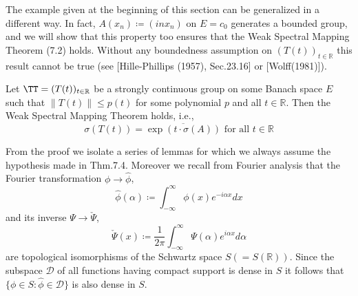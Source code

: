 The example given at the beginning of this section can be generalized in a different way.
In fact, $A(x_{n}) \coloneqq (inx_{n})$ on $E = c_{0}$ generates a bounded group, and we will show that this property too ensures that the Weak Spectral Mapping Theorem (7.2) holds.
Without any boundedness assumption on $(T(t))_{t\in\mathbb{R}}$ this result cannot be true (see [Hille-Phillips (1957), Sec.23.16] or [Wolff(1981)]).


\newpage
\begin{theorem}\label{thm:a3-7.4}
	Let $\TT = (T(t))_{t\in\mathbb{R}}$ be a strongly continuous group on some Banach space $E$ such that $\|T(t)\| \leq p(t)$ for some polynomial $p$ and all $t \in \mathbb{R}$.
	Then the Weak Spectral Mapping Theorem holds, i.e.,
	\[
	\sigma(T(t)) = \overline{\exp(t\cdot\sigma(A))} \text{ for all } t \in \mathbb{R}
	\]
\end{theorem}

From the proof we isolate a series of lemmas for which we always assume the hypothesis made in Thm.7.4.
Moreover we recall from Fourier analysis that the Fourier transformation $\phi \to \hat{\phi}$,
\[
\hat{\phi}(\alpha) \coloneqq \int_{-\infty}^{\infty} \phi(x)e^{-i\alpha x} dx
\]
and its inverse $\Psi \to \check{\Psi}$,
\[
\check{\Psi}(x) \coloneqq \frac{1}{2\pi}\int_{-\infty}^{\infty} \Psi(\alpha)e^{i\alpha x} d\alpha
\]
are topological isomorphisms of the Schwartz space $S ( = S(\mathbb{R}))$.
Since the subspace $\mathcal{D}$ of all functions having compact support is dense in $S$ it follows that $\{\phi \in S \colon \hat{\phi} \in \mathcal{D}\}$ is also dense in $S$.

